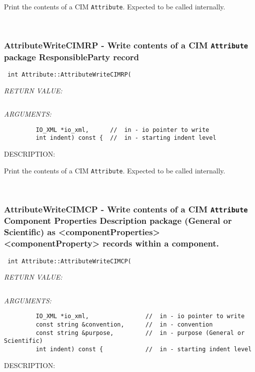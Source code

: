       Print the contents of a CIM {\tt Attribute}.  Expected to be
      called internally.
   
 
\mbox{}\hrulefill\
 
\subsubsection [AttributeWriteCIMRP] {AttributeWriteCIMRP - Write contents of a CIM {\tt Attribute} package ResponsibleParty record}


  
\begin{verbatim} int Attribute::AttributeWriteCIMRP(\end{verbatim}{\em RETURN VALUE:}
\begin{verbatim} \end{verbatim}{\em ARGUMENTS:}
\begin{verbatim}         IO_XML *io_xml,      //  in - io pointer to write
         int indent) const {  //  in - starting indent level\end{verbatim}
{\sf DESCRIPTION:\\ }


      Print the contents of a CIM {\tt Attribute}.  Expected to be
      called internally.
   
 
\mbox{}\hrulefill\
 
\subsubsection [AttributeWriteCIMCP] {AttributeWriteCIMCP - Write contents of a CIM {\tt Attribute} Component Properties Description package (General or Scientific) as <componentProperties><componentProperty> records within a component.}


  
\begin{verbatim} int Attribute::AttributeWriteCIMCP(\end{verbatim}{\em RETURN VALUE:}
\begin{verbatim} \end{verbatim}{\em ARGUMENTS:}
\begin{verbatim}         IO_XML *io_xml,                //  in - io pointer to write
         const string &convention,      //  in - convention
         const string &purpose,         //  in - purpose (General or Scientific)
         int indent) const {            //  in - starting indent level\end{verbatim}
{\sf DESCRIPTION:\\ }


